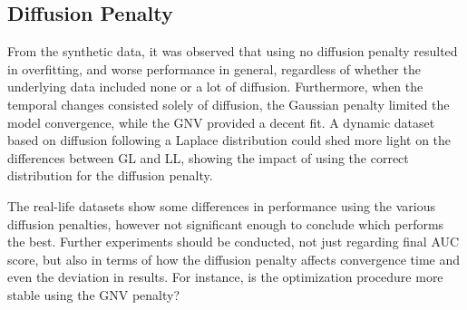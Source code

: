 \subsection{Diffusion Penalty}

    From the synthetic data, it was observed that using no diffusion penalty resulted in overfitting, and worse performance in general, regardless of whether the underlying data included none or a lot of diffusion. Furthermore, when the temporal changes consisted solely of diffusion, the Gaussian penalty limited the model convergence, while the GNV provided a decent fit.
    A dynamic dataset based on diffusion following a Laplace distribution could shed more light on the differences between GL and LL, showing the impact of using the correct distribution for the diffusion penalty.

    The real-life datasets show some differences in performance using the various diffusion penalties, however not significant enough to conclude which performs the best. Further experiments should be conducted, not just regarding final AUC score, but also in terms of how the diffusion penalty affects convergence time and even the deviation in results. For instance, is the optimization procedure more stable using the GNV penalty?
